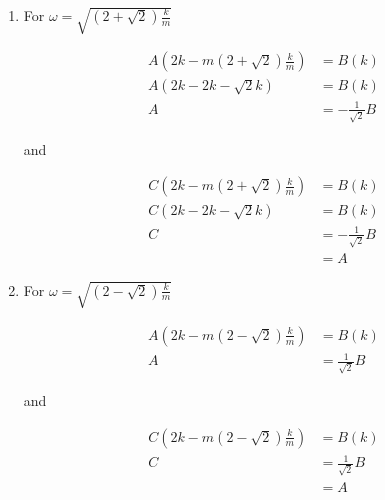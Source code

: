 \documentclass{article}
\begin{document}
\begin{enumerate}
\begin{enumerate}
          \item For $\omega = \sqrt{(2 + \sqrt{2}) \frac{k}{m}}$

                \begin{align*}
                  A \left( 2 k - m (2 + \sqrt{2}) \frac{k}{m} \right) & = B (k)                 \\
                  A (2 k - 2 k - \sqrt{2} k)                          & = B (k)                 \\
                  A                                                   & = -\frac{1}{\sqrt{2}} B
                \end{align*}

                and

                \begin{align*}
                  C \left( 2 k - m (2 + \sqrt{2}) \frac{k}{m} \right) & = B (k)                 \\
                  C (2 k - 2 k - \sqrt{2} k)                          & = B (k)                 \\
                  C                                                   & = -\frac{1}{\sqrt{2}} B \\
                                                                      & = A
                \end{align*}

          \item For $\omega = \sqrt{(2 - \sqrt{2}) \frac{k}{m}}$

                \begin{align*}
                  A \left( 2 k - m (2 - \sqrt{2}) \frac{k}{m} \right) & = B (k)                \\
                  A                                                   & = \frac{1}{\sqrt{2}} B
                \end{align*}

                and

                \begin{align*}
                  C \left(2 k - m (2 - \sqrt{2}) \frac{k}{m} \right) & = B (k)                \\
                  C                                                  & = \frac{1}{\sqrt{2}} B \\
                                                                     & = A
                \end{align*}
        \end{enumerate}
\end{enumerate}
\end{document}
